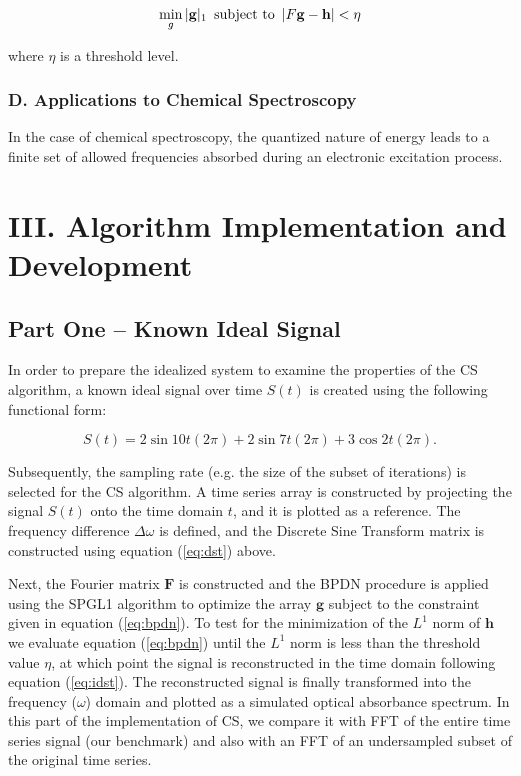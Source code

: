 \documentclass[11pt]{article}
\begin{document}
\begin{equation}\label{eq:bpdn}
    \min_{g} |\mathbf{g}|_{1} \text{ \,subject to \,} |F \mathbf{g} - \mathbf{h}| < \eta
\end{equation}

where $\eta$ is a threshold level.
\subsubsection*{D.	Applications to Chemical Spectroscopy}	%

\par In the case of chemical spectroscopy, the quantized nature of energy leads to a finite set of allowed frequencies absorbed during an electronic excitation process. 


\section*{III.	Algorithm Implementation and Development}
\subsection*{Part One -- Known Ideal Signal}
In order to prepare the idealized system to examine the properties of the CS algorithm, a known ideal signal over time $S(t)$ is created using the following functional form:

\begin{equation}\label{eq:ideal}
	S(t) = 2\sin{10t(2\pi)}+2\sin{7t(2\pi)} + 3\cos{2t(2\pi)}.
\end{equation}

\par Subsequently, the sampling rate (e.g. the size of the subset of iterations) is selected for the CS algorithm. A time series array is constructed by projecting the signal $S(t)$ onto the time domain $t$, and it is plotted as a reference.  The frequency difference $\Delta\omega$ is defined, and the Discrete Sine Transform matrix is constructed using equation (\ref{eq:dst}) above.  

\par Next, the Fourier matrix $\mathbf{F}$ is constructed and the BPDN procedure is applied using the SPGL1 algorithm to optimize the array $\mathbf{g}$ subject to the constraint given in equation (\ref{eq:bpdn}). To test for the minimization of the $L^{1}$ norm of $\mathbf{h}$ we evaluate equation (\ref{eq:bpdn}) until the $L^{1}$ norm is less than the threshold value $\eta$, at which point the signal is reconstructed in the time domain following equation (\ref{eq:idst}).  The reconstructed signal is finally transformed into the frequency ($\omega$) domain and plotted as a simulated optical absorbance spectrum. In this part of the implementation of CS, we compare it with FFT of the entire time series signal (our benchmark) and also with an FFT of an undersampled subset of the original time series.  
\end{document}
